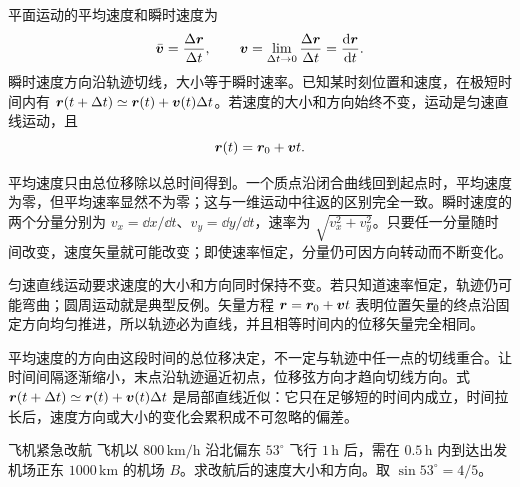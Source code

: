 {平面运动的平均速度和瞬时速度为
\begin{equation}
\bar{\bm{v}}=\frac{\Delta\bm{r}}{\Delta t},\qquad
\bm{v}=\lim_{\Delta t\to0}\frac{\Delta\bm{r}}{\Delta t}=\frac{\mathop{}\!\mathrm d\bm{r}}{\mathop{}\!\mathrm d t}.
\end{equation}
瞬时速度方向沿轨迹切线，大小等于瞬时速率。已知某时刻位置和速度，在极短时间内有 $\bm{r}(t+\Delta t)\simeq\bm{r}(t)+\bm{v}(t)\Delta t$。若速度的大小和方向始终不变，运动是匀速直线运动，且
\begin{equation}
  \bm{r}(t)=\bm{r}_0+\bm{v}t.
\end{equation}

平均速度只由总位移除以总时间得到。一个质点沿闭合曲线回到起点时，平均速度为零，但平均速率显然不为零；这与一维运动中往返的区别完全一致。瞬时速度的两个分量分别为 $v_x=\dd x/\dd t$、$v_y=\dd y/\dd t$，速率为 $\sqrt{v_x^2+v_y^2}$。只要任一分量随时间改变，速度矢量就可能改变；即使速率恒定，分量仍可因方向转动而不断变化。

匀速直线运动要求速度的大小和方向同时保持不变。若只知道速率恒定，轨迹仍可能弯曲；圆周运动就是典型反例。矢量方程 $\bm{r}=\bm{r}_0+\bm{v}t$ 表明位置矢量的终点沿固定方向均匀推进，所以轨迹必为直线，并且相等时间内的位移矢量完全相同。

\CurveVelocityDiagram

平均速度的方向由这段时间的总位移决定，不一定与轨迹中任一点的切线重合。让时间间隔逐渐缩小，末点沿轨迹逼近初点，位移弦方向才趋向切线方向。式 $\bm{r}(t+\Delta t)\simeq\bm{r}(t)+\bm{v}(t)\Delta t$ 是局部直线近似：它只在足够短的时间内成立，时间拉长后，速度方向或大小的变化会累积成不可忽略的偏差。

\begin{origexamplebox}{飞机紧急改航}\label{ch03:ex:k03-2-27}
飞机以 $800\,\mathrm{km/h}$ 沿北偏东 $53^\circ$ 飞行 $1\,\mathrm h$ 后，需在 $0.5\,\mathrm h$ 内到达出发机场正东 $1000\,\mathrm{km}$ 的机场 $B$。求改航后的速度大小和方向。取 $\sin53^\circ=4/5$。


\end{origexamplebox}}
